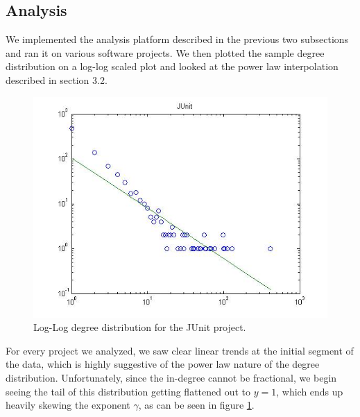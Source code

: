 \documentclass[11pt,a4paper,twocolumn]{article}
\begin{document}
\begin{singlespace}
\subsection{Analysis}
We implemented the analysis platform described in the previous two subsections
and ran it on
various software projects. We then plotted the sample degree distribution on a log-log
scaled plot and looked at the power law interpolation described in section 3.2.
\begin{figure}
\centering
\caption{Log-Log degree distribution for the JUnit project.\label{fig:marsold}}
\includegraphics[scale=0.45]{images/marsold}
\end{figure}
For every project we analyzed, we saw clear linear trends at the initial segment of the
data, which is highly suggestive of the power law nature of the degree distribution.
Unfortunately, since the in-degree cannot be fractional, we begin seeing the tail
of this distribution getting flattened out to $y = 1$, which ends up heavily skewing
the exponent $\gamma$, as can be seen in figure \ref{fig:marsold}.


\end{singlespace}
\end{document}
